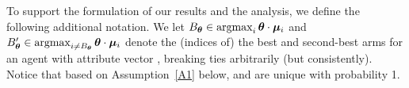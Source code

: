 


To support the formulation of our results and the analysis,
we define the following additional notation.
We let
$B_{\bm{\theta}} \in \mathop{\mathrm{argmax}}_i \bm{\theta} \cdot \bm{\mu}_{i}$
and
$ B'_{\bm{\theta}} \in \mathop{\mathrm{argmax}}_{i \neq B_{\bm{\theta}}} \bm{\theta} \cdot \bm{\mu}_{i}$
denote the (indices of) the best and second-best arms for an agent
with attribute vector \AgV,
breaking ties arbitrarily (but consistently).
Notice that based on Assumption~\ref{A1} below,
  \Best{\AgV} and \Second{\AgV} are unique with probability 1.


